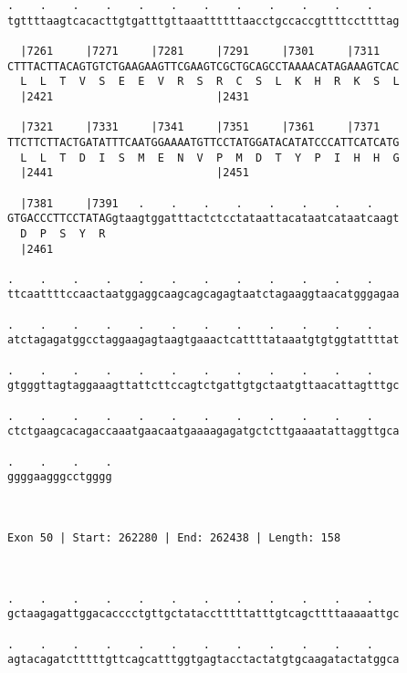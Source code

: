 \documentclass{article}
\begin{document}
\begin{Verbatim}
.    .    .    .    .    .    .    .    .    .    .    .    
tgttttaagtcacacttgtgatttgttaaattttttaacctgccaccgttttccttttag
                                                            
  |7261     |7271     |7281     |7291     |7301     |7311   
CTTTACTTACAGTGTCTGAAGAAGTTCGAAGTCGCTGCAGCCTAAAACATAGAAAGTCAC
  L  L  T  V  S  E  E  V  R  S  R  C  S  L  K  H  R  K  S  L
  |2421                         |2431                       
  
  |7321     |7331     |7341     |7351     |7361     |7371   
TTCTTCTTACTGATATTTCAATGGAAAATGTTCCTATGGATACATATCCCATTCATCATG
  L  L  T  D  I  S  M  E  N  V  P  M  D  T  Y  P  I  H  H  G
  |2441                         |2451                       
  
  |7381     |7391   .    .    .    .    .    .    .    .    
GTGACCCTTCCTATAGgtaagtggatttactctcctataattacataatcataatcaagt
  D  P  S  Y  R                                             
  |2461                                                     
  
.    .    .    .    .    .    .    .    .    .    .    .    
ttcaattttccaactaatggaggcaagcagcagagtaatctagaaggtaacatgggagaa
                                                            
.    .    .    .    .    .    .    .    .    .    .    .    
atctagagatggcctaggaagagtaagtgaaactcattttataaatgtgtggtattttat
                                                            
.    .    .    .    .    .    .    .    .    .    .    .    
gtgggttagtaggaaagttattcttccagtctgattgtgctaatgttaacattagtttgc
                                                            
.    .    .    .    .    .    .    .    .    .    .    .    
ctctgaagcacagaccaaatgaacaatgaaaagagatgctcttgaaaatattaggttgca
                                                            
.    .    .    .
ggggaagggcctgggg
                
                
 
Exon 50 | Start: 262280 | End: 262438 | Length: 158



.    .    .    .    .    .    .    .    .    .    .    .    
gctaagagattggacacccctgttgctatacctttttatttgtcagcttttaaaaattgc
                                                            
.    .    .    .    .    .    .    .    .    .    .    .    
agtacagatctttttgttcagcatttggtgagtacctactatgtgcaagatactatggca
                                                            

\end{Verbatim}
\end{document}
